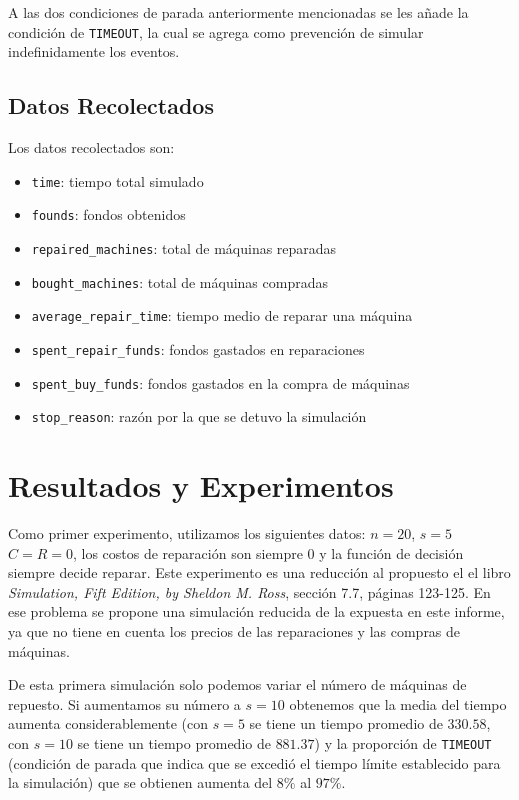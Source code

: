 \documentclass[10pt,twocolumn]{article}
\begin{document}
A las dos condiciones de parada anteriormente mencionadas se les añade la condición de \texttt{TIMEOUT}, la cual se agrega como prevención de simular indefinidamente los eventos.

\subsection{Datos Recolectados}
Los datos recolectados son:
\begin{itemize}
    \item \texttt{time}: tiempo total simulado
    \item \texttt{founds}: fondos obtenidos
    \item \texttt{repaired\_machines}: total de máquinas reparadas
    \item \texttt{bought\_machines}: total de máquinas compradas
    \item \texttt{average\_repair\_time}: tiempo medio de reparar una máquina
    \item \texttt{spent\_repair\_funds}: fondos gastados en reparaciones
    \item \texttt{spent\_buy\_funds}: fondos gastados en la compra de máquinas
    \item \texttt{stop\_reason}: razón por la que se detuvo la simulación
\end{itemize}


\section{Resultados y Experimentos}

Como primer experimento, utilizamos los siguientes datos: $n = 20$, $s = 5$ $C = R = 0$, los costos de reparación son siempre 0 y la función de decisión siempre decide reparar. Este experimento es una reducción al propuesto el el libro \textit{Simulation, Fift Edition, by Sheldon M. Ross}, sección 7.7, páginas 123-125. En ese problema se propone una simulación reducida de la expuesta en este informe, ya que no tiene en cuenta los precios de las reparaciones y las compras de máquinas.

De esta primera simulación solo podemos variar el número de máquinas de repuesto. Si aumentamos su número a $s = 10$ obtenemos que la media del tiempo aumenta considerablemente (con $s = 5$ se tiene un tiempo promedio de $330.58$, con $s = 10$ se tiene un tiempo promedio de $881.37$) y la proporción de \texttt{TIMEOUT} (condición de parada que indica que se excedió el tiempo límite establecido para la simulación) que se obtienen aumenta del $8\%$ al $97\%$.
\end{document}
